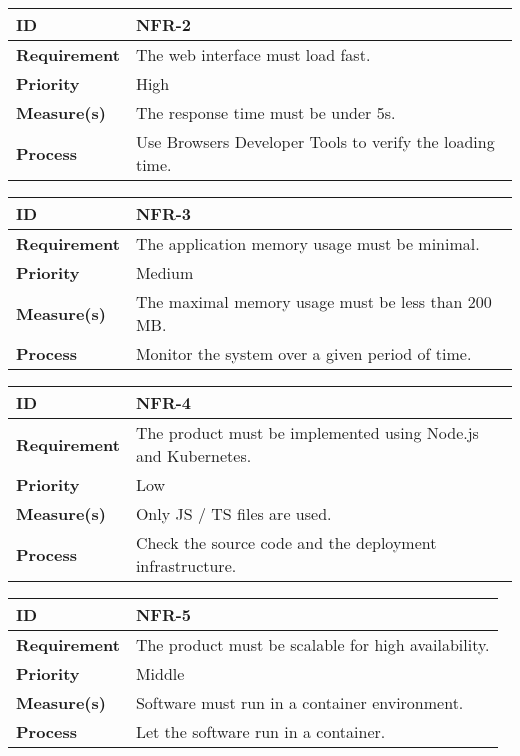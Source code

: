 \begin{center}
\begin{tabular}{ | m{8em} | m{25em}| } 
 \hline
 \textbf{ID} & NFR-2\\ 
 \hline
 \textbf{Requirement} & The web interface must load fast.\\
 \hline
 \textbf{Priority} & High\\
 \hline
 \textbf{Measure(s)} & The response time must be under 5s.\\
 \hline
 \textbf{Process} & Use Browsers Developer Tools to verify the loading time.\\
 \hline
\end{tabular}
\end{center}

\begin{center}
\begin{tabular}{ | m{8em} | m{25em}| } 
 \hline
 \textbf{ID} & NFR-3\\ 
 \hline
 \textbf{Requirement} & The application memory usage must be minimal.\\
 \hline
 \textbf{Priority} & Medium\\
 \hline
 \textbf{Measure(s)} & The maximal memory usage must be less than 200 MB.\\
 \hline
 \textbf{Process} & Monitor the system over a given period of time.\\
 \hline
\end{tabular}
\end{center}

\begin{center}
\begin{tabular}{ | m{8em} | m{25em}| } 
 \hline
 \textbf{ID} & NFR-4\\ 
 \hline
 \textbf{Requirement} & The product must be implemented using Node.js and Kubernetes.\\
 \hline
 \textbf{Priority} & Low\\
 \hline
 \textbf{Measure(s)} & Only JS / TS files are used.\\
 \hline
 \textbf{Process} & Check the source code and the deployment infrastructure.\\
 \hline
\end{tabular}
\end{center}

\begin{center}
\begin{tabular}{ | m{8em} | m{25em}| } 
 \hline
 \textbf{ID} & NFR-5\\ 
 \hline
 \textbf{Requirement} & The product must be scalable for high availability.\\
 \hline
 \textbf{Priority} & Middle\\
 \hline
 \textbf{Measure(s)} & Software must run in a container environment.\\
 \hline
 \textbf{Process} & Let the software run in a container.\\
 \hline
\end{tabular}
\end{center}

